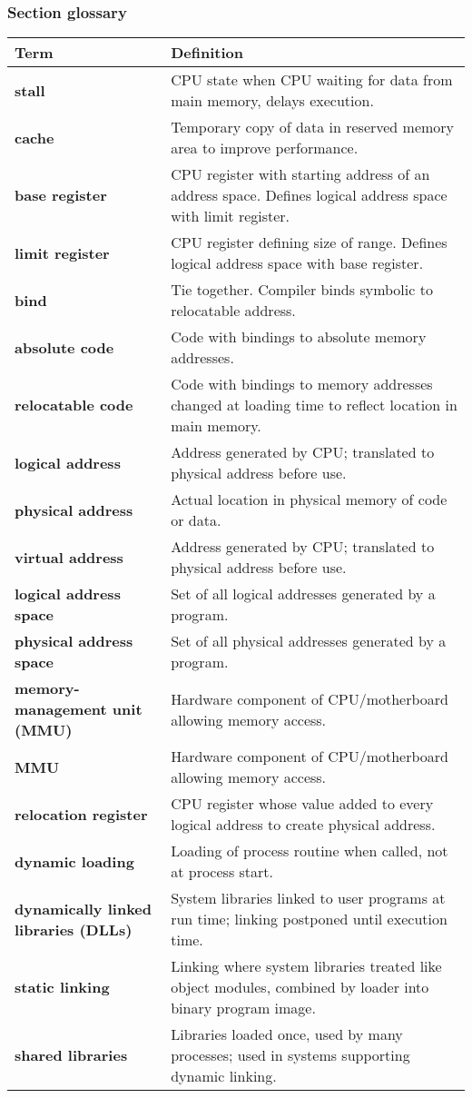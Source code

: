 \subsubsection*{Section glossary}
\begin{tabular}{p{}p{}}
    \toprule
    \textbf{Term} & \textbf{Definition} \\
    \midrule
    \textbf{stall} & CPU state when CPU waiting for data from main memory, delays execution. \\
    \textbf{cache} & Temporary copy of data in reserved memory area to improve performance. \\
    \textbf{base register} & CPU register with starting address of an address space. Defines logical address space with limit register. \\
    \textbf{limit register} & CPU register defining size of range. Defines logical address space with base register. \\
    \textbf{bind} & Tie together. Compiler binds symbolic to relocatable address. \\
    \textbf{absolute code} & Code with bindings to absolute memory addresses. \\
    \textbf{relocatable code} & Code with bindings to memory addresses changed at loading time to reflect location in main memory. \\
    \textbf{logical address} & Address generated by CPU; translated to physical address before use. \\
    \textbf{physical address} & Actual location in physical memory of code or data. \\
    \textbf{virtual address} & Address generated by CPU; translated to physical address before use. \\
    \textbf{logical address space} & Set of all logical addresses generated by a program. \\
    \textbf{physical address space} & Set of all physical addresses generated by a program. \\
    \textbf{memory-management unit (MMU)} & Hardware component of CPU/motherboard allowing memory access. \\
    \textbf{MMU} & Hardware component of CPU/motherboard allowing memory access. \\
    \textbf{relocation register} & CPU register whose value added to every logical address to create physical address. \\
    \textbf{dynamic loading} & Loading of process routine when called, not at process start. \\
    \textbf{dynamically linked libraries (DLLs)} & System libraries linked to user programs at run time; linking postponed until execution time. \\
    \textbf{static linking} & Linking where system libraries treated like object modules, combined by loader into binary program image. \\
    \textbf{shared libraries} & Libraries loaded once, used by many processes; used in systems supporting dynamic linking. \\
    \bottomrule
\end{tabular}
